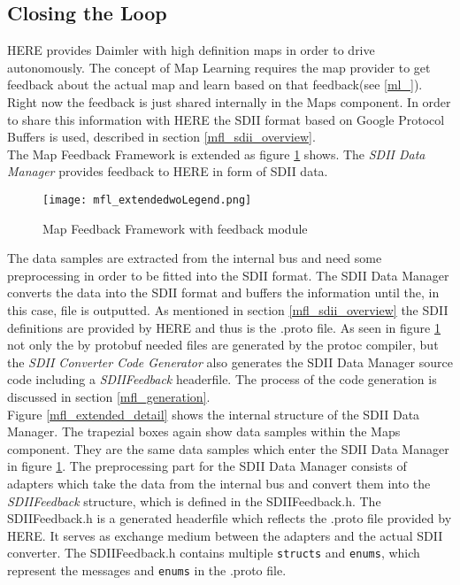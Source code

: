 \subsection{Closing the Loop}
\label{mfl_closing_loop}
HERE provides Daimler with high definition maps in order to drive autonomously. The concept of Map Learning requires the map provider to get feedback about the actual map and learn based on that feedback(see \ref{ml_}). Right now the feedback is just shared internally in the Maps component. In order to share this information with HERE the SDII format based on Google Protocol Buffers is used, described in section \ref{mfl_sdii_overview}.\\
The Map Feedback Framework is extended as figure \ref{mfl_extended} shows. The \emph{SDII Data Manager} provides feedback to HERE in form of SDII data.
\begin{figure}[!hbt]
\texttt{[image: mfl\_extendedwoLegend.png]}
\caption{Map Feedback Framework with feedback module}
\label{mfl_extended}
\end{figure}
The data samples are extracted from the internal bus and need some preprocessing in order to be fitted into the SDII format. The SDII Data Manager converts the data into the SDII format and buffers the information until the, in this case, file is outputted. As mentioned in section \ref{mfl_sdii_overview} the SDII definitions are provided by HERE and thus is the .proto file. As seen in figure \ref{mfl_extended} not only the by protobuf needed files are generated by the protoc compiler, but the \emph{SDII Converter Code Generator} also generates the SDII Data Manager source code including a \emph{SDIIFeedback} headerfile. The process of the code generation is discussed in section \ref{mfl_generation}. \\
Figure \ref{mfl_extended_detail} shows the internal structure of the SDII Data Manager. The trapezial boxes again show data samples within the Maps component. They are the same data samples which enter the SDII Data Manager in figure \ref{mfl_extended}. The preprocessing part for the SDII Data Manager consists of adapters which take the data from the internal bus and convert them into the \emph{SDIIFeedback} structure, which is defined in the SDIIFeedback.h. The SDIIFeedback.h is a generated headerfile which reflects the .proto file provided by HERE. It serves as exchange medium between the adapters and the actual SDII converter. The SDIIFeedback.h contains multiple \verb|structs| and \verb|enums|, which represent the messages and \verb|enums| in the .proto file.\\
